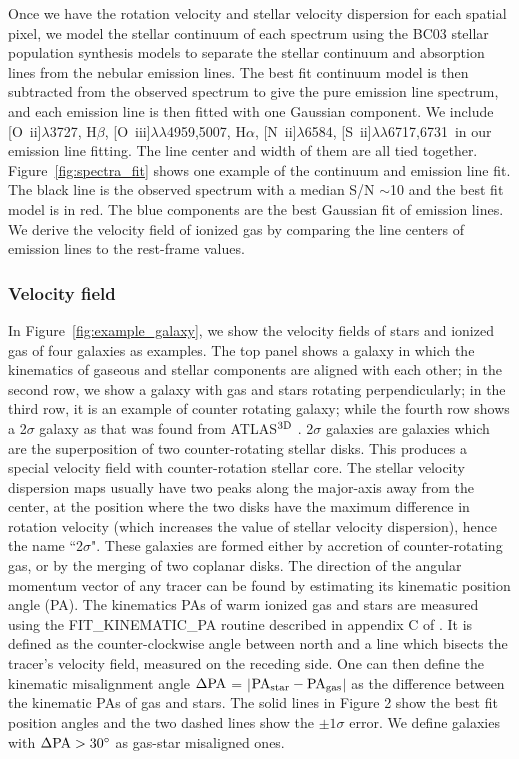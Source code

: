 \documentclass[a4paper,fleqn,usenatbib]{mnras}
\newcommand{\oii}{[{O~\sc ii}]$\lambda$3727}
\newcommand{\oiii}{[{O~\sc iii}]$\lambda\lambda$4959,5007}
\newcommand{\nii}{[{N~\sc ii}]$\lambda$6584}
\newcommand{\sii}{[{S~\sc ii}]$\lambda\lambda$6717,6731}
\begin{document}
Once we have the rotation velocity and stellar velocity dispersion for each spatial pixel,
we  model  the  stellar  continuum  of  each spectrum using the BC03 stellar population synthesis models 
to separate  the  stellar continuum and absorption lines from the nebular emission lines.
The best fit continuum model is then subtracted from the observed spectrum 
to give the pure emission line spectrum, and each 
emission line is then fitted with one Gaussian component. 
We include \oii, H$\beta$, \oiii, H$\alpha$, \nii, \sii\ in our emission line fitting.
The line center and width of them are all tied together.
Figure~\ref{fig:spectra_fit} shows one example of the continuum and emission line fit. The black line is the observed spectrum with a median S/N $\sim$10 and the best fit model is in red. The blue components are the best Gaussian fit of emission lines. 
We derive the velocity field of ionized gas by comparing the line centers of emission lines to the rest-frame values. 

\subsubsection{Velocity field}\label{sec:rotmap}
In Figure~\ref{fig:example_galaxy}, we show the velocity fields of stars and ionized gas of four galaxies as examples.
The top panel shows a galaxy in which the kinematics of gaseous and stellar 
components are aligned with each other; in the second row, we show a galaxy with gas and stars  
rotating perpendicularly; in the third row, it is an example of counter rotating 
galaxy; while the fourth row shows a 2$\sigma$ galaxy as that was found from ATLAS$^{\rm 3D}$ 
\citep{krajnovic-2011}. 2$\sigma$ galaxies are galaxies which are the superposition 
of two counter-rotating stellar disks. This produces a special velocity field with 
counter-rotation stellar core. The stellar velocity dispersion maps usually have two peaks along the 
major-axis away from the center, at the position where the two disks 
have the maximum difference in rotation velocity (which increases the value of stellar velocity dispersion), 
hence the name ``2$\sigma$". These galaxies are formed either by accretion 
of counter-rotating gas, or by the merging of two coplanar disks. 
The direction of the angular momentum vector of any tracer 
can be found by estimating its kinematic position angle (PA). 
The kinematics PAs of warm ionized gas and stars are measured using the FIT\_KINEMATIC\_PA 
routine described in appendix C of \cite{krajnovic-2006}. 
It is defined as the counter-clockwise angle between north and a line which bisects 
the tracer's velocity field, measured on the receding side. One can then define the 
kinematic misalignment angle ${\rm \Delta PA}$ = $|$${\rm PA}_{\rm star} -  {\rm PA}_{\rm gas}$$|$ as the difference between 
the kinematic PAs of gas and stars.
The solid lines in Figure 2 show the best fit position 
angles and the two dashed lines show the $\pm 1\sigma$ error. We define galaxies with 
${\rm \Delta PA}>30^\circ$ as gas-star misaligned ones. 
\end{document}
